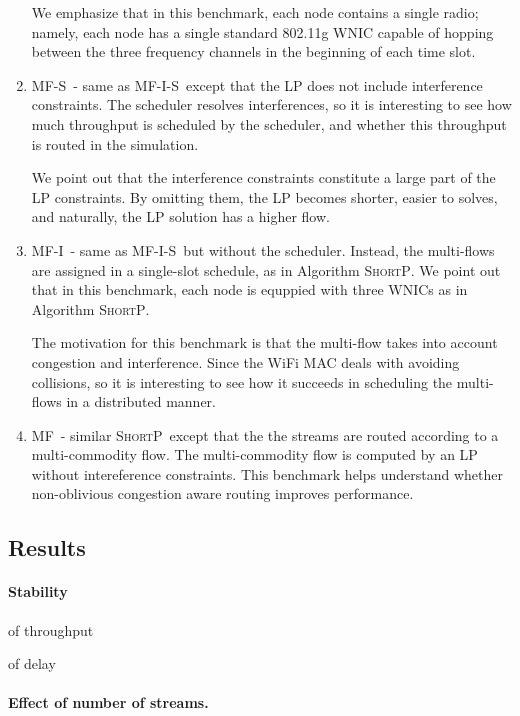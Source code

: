 \documentclass[12pt]{article}
\newenvironment{proof sketch}[1]{\noindent {\emph{Proof sketch of #1:}}}{\hfill \qed}
\newcommand{\algA}{\textsc{MF-I-S}}
\newcommand{\algB}{\textsc{ShortP}}
\newcommand{\algC}{\textsc{MF-I}}
\newcommand{\algD}{\textsc{MF}}
\newcommand{\algE}{\textsc{MF-S}}
\newcommand{\algS}{\algB}
\begin{document}
\begin{enumerate}
  We emphasize that in this benchmark, each node contains a single
  radio; namely, each node has a single standard 802.11g WNIC capable
  of hopping between the three frequency channels in the beginning of
  each time slot.

\item \algE\ - same as \algA\ except that the LP does not include
  interference constraints. The scheduler resolves interferences, so
  it is interesting to see how much throughput is scheduled by the
  scheduler, and whether this throughput is routed in the simulation.

  We point out that the interference constraints constitute a large
  part of the LP constraints. By omitting them, the LP becomes
  shorter, easier to solves, and naturally, the LP solution has a
  higher flow.

\item \algC\ - same as \algA\ but without the scheduler.  Instead, the
  multi-flows are assigned in a single-slot schedule, as in Algorithm
  \algS. We point out that in this benchmark, each node is equppied
  with three WNICs as in Algorithm \algS.

  The motivation for this benchmark is that the multi-flow takes into
  account congestion and interference. Since the WiFi MAC deals with
  avoiding collisions, so it is interesting to see how it succeeds in
  scheduling the multi-flows in a distributed manner.

\item \algD\ - similar \algS\ except that the the streams are routed
  according to a multi-commodity flow. The multi-commodity flow is
  computed by an LP without intereference constraints.  This benchmark
  helps understand whether non-oblivious congestion aware routing
  improves performance.


\end{enumerate}

\subsection{Results}

\paragraph{Stability}
of throughput

of delay

\paragraph{Effect of number of streams.}
\end{document}
